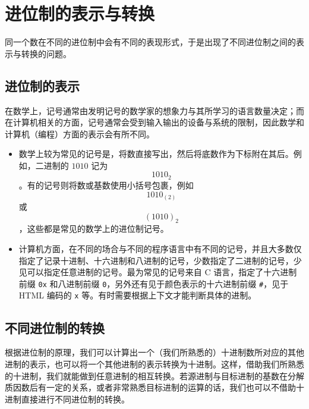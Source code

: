 \section{进位制的表示与转换}\label{sec:ArithBasics/positional-notation-presentation-and-conversion}
    同一个数在不同的进位制中会有不同的表现形式，于是出现了不同进位制之间的表示与转换的问题。
    \subsection{进位制的表示}\label{subsec:ArithBasics/positional-notation-presentation-and-conversion/presentation}
        在数学上，记号通常由发明记号的数学家的想象力与其所学习的语言数量决定；而在计算机相关的方面，记号通常会受到输入输出的设备与系统的限制，因此数学和计算机（编程）方面的表示会有所不同。
        \begin{itemize}
            \item 数学上较为常见的记号是，将数直接写出，然后将底数作为下标附在其后。例如，二进制的 $1010$ 记为\[1010_2\]。有的记号则将数或基数使用小括号包裹，例如\[1010_{(2)}\]或\[(1010)_2\]，这些都是常见的数学上的进位制记号。
            \item 计算机方面，在不同的场合与不同的程序语言中有不同的记号，并且大多数仅指定了记录十进制、十六进制和八进制的记号，少数指定了二进制的记号，少见可以指定任意进制的记号。最为常见的记号来自 C 语言，指定了十六进制前缀 \texttt{0x} 和八进制前缀 \texttt{0}，另外还有见于颜色表示的十六进制前缀 \texttt{\#}，见于 HTML 编码的 \texttt{x} 等。有时需要根据上下文才能判断具体的进制。
        \end{itemize}
    \subsection{不同进位制的转换}\label{subsec:ArithBasics/positional-notation-presentation-and-conversion/conversion}
        根据进位制的原理，我们可以计算出一个（我们所熟悉的）十进制数所对应的其他进制的表示，也可以将一个其他进制的表示转换为十进制。这样，借助我们所熟悉的十进制，我们就能做到任意进制的相互转换。若源进制与目标进制的基数在分解质因数后有一定的关系，或者非常熟悉目标进制的运算的话，我们也可以不借助十进制直接进行不同进位制的转换。

